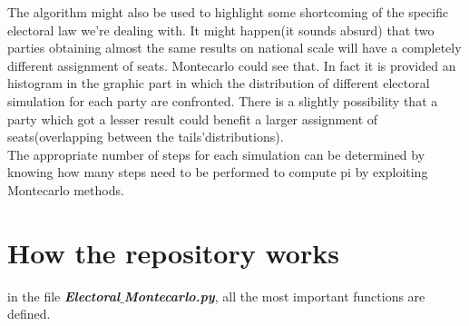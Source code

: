 \documentclass[12pt,a4paper,openright]{report}
\begin{document}
The algorithm might also be used to highlight some shortcoming of the specific electoral law we're dealing with. It might happen(it sounds absurd) that two parties obtaining almost the same results on national scale will have a completely different assignment of seats. Montecarlo could see that. In fact it is provided an histogram in the graphic part in which the distribution of different electoral simulation for each party are confronted. There is a slightly possibility that a party which got a lesser result could benefit a larger assignment of seats(overlapping between the tails'distributions).\\
The appropriate number of steps for each simulation can be determined by knowing how many steps need to be performed to compute pi by exploiting Montecarlo methods.\\
\section*{How the repository works}
in the file \textit{\textbf{Electoral$\_$Montecarlo.py}}, all the most important functions are defined.
\end{document}
